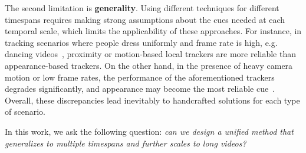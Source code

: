 \documentclass[10pt,twocolumn,letterpaper]{article}
\begin{document}
The second limitation is \noindent\textbf{generality}. Using different techniques for different timespans requires making strong assumptions about the cues needed at each temporal scale, which limits the applicability of these approaches. 
For instance, in tracking scenarios where people dress uniformly and frame rate is high, e.g. dancing videos~\cite{dancetrack}, proximity or motion-based local trackers \cite{tracktor,centertrack, bytetrack, sort} are more reliable than appearance-based trackers. 
On the other hand, in the presence of heavy camera motion or low frame rates, the performance of the aforementioned trackers degrades significantly, and appearance may become the most reliable cue~\cite{qdtrack, bdd}. 
Overall, these discrepancies lead inevitably to handcrafted solutions for each type of scenario.






In this work, we ask the following question: \textit{can we design a unified method that generalizes to multiple timespans and further scales to long videos?}
\end{document}

